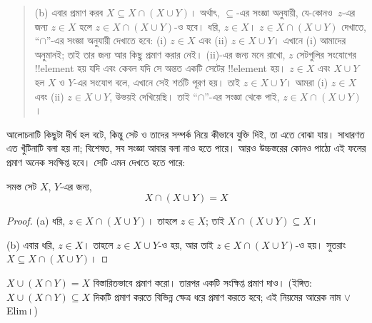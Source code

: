 \documentclass[../../../include/open-logic-section]{subfiles}
\begin{document}
\begin{explain}
\begin{quote}
(b) এবার প্রমাণ করব $X \subseteq X \cap (X \cup Y)$।
অর্থাৎ, $\subseteq$-এর সংজ্ঞা অনুযায়ী, যে-কোনও~$z$-এর জন্য
$z \in X$ হলে $z \in X \cap (X \cup Y)$-ও হবে। ধরি, $z \in X$।
$z \in X \cap (X \cup Y)$ দেখাতে, ``$\cap$''-এর সংজ্ঞা অনুযায়ী
দেখাতে হবে: (i) $z \in X$ এবং (ii) $z \in X \cup Y$।
এখানে (i) আমাদের অনুমানই; তাই তার জন্য আর কিছু প্রমাণ করার নেই।
(ii)-এর জন্য মনে রাখো, $z$ সেটগুলির সংযোগের !!{element} হয় যদি
এবং কেবল যদি সে অন্তত একটি সেটের !!{element} হয়।
$z \in X$ এবং $X \cup Y$ হল $X$ ও $Y$-এর সংযোগ বলে,
এখানে সেই শর্তটি পূরণ হয়। তাই $z \in X \cup Y$। আমরা
(i) $z \in X$ এবং (ii) $z \in X \cup Y$, উভয়ই দেখিয়েছি।
তাই ``$\cap$''-এর সংজ্ঞা থেকে পাই, $z \in X \cap (X \cup Y)$।
\end{quote}

আলোচনাটি কিছুটা দীর্ঘ হল বটে, কিন্তু সেট ও তাদের সম্পর্ক নিয়ে
কীভাবে যুক্তি দিই, তা এতে বোঝা যায়। সাধারণত এত খুঁটিনাটি বলা হয় না;
বিশেষত, সব সংজ্ঞা আবার বলা নাও হতে পারে। আরও উচ্চস্তরের কোনও
পাঠ্যে এই ফলের প্রমাণ অনেক সংক্ষিপ্ত হবে। সেটি এমন দেখতে হতে পারে:
\end{explain}


\begin{prop}[শোষণ]
সমস্ত সেট $X$, $Y$-এর জন্য,
\[
X \cap (X \cup Y) = X
\]
\end{prop}

\begin{proof}
(a) ধরি, $z \in X \cap (X \cup Y)$। তাহলে $z \in X$;
তাই $X \cap (X \cup Y) \subseteq X$।

(b) এবার ধরি, $z \in X$। তাহলে $z \in X \cup Y$-ও হয়,
আর তাই $z \in X \cap (X \cup Y)$-ও হয়।
সুতরাং $X \subseteq X \cap (X \cup Y)$।
\end{proof}

\begin{prob}
$X \cup (X \cap Y) = X$ বিস্তারিতভাবে প্রমাণ করো। তারপর
একটি সংক্ষিপ্ত প্রমাণ দাও। (ইঙ্গিত: $X \cup (X \cap Y) \subseteq X$
দিকটি প্রমাণ করতে বিভিন্ন ক্ষেত্র ধরে প্রমাণ করতে হবে; এই নিয়মের
আরেক নাম $\lor$Elim।)
\end{prob}
\end{document}
